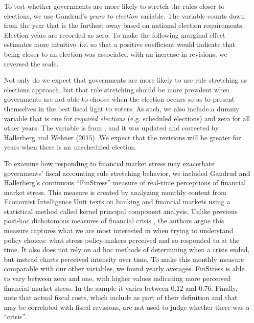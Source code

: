 \documentclass[]{article}
\begin{document}
To test whether governments are more likely to stretch the rules closer to elections, we use Gandrud's \citeyearpar{gandrudYrcurnt} \emph{years to election} variable. The variable counts down from the year that is the furthest away based on national election requirements. Election years are recorded as zero. To make the following marginal effect estimates more intuitive--i.e. so that a positive coefficient would indicate that being closer to an election was associated with an increase in revisions, we reversed the scale.

Not only do we expect that governments are more likely to use rule stretching as elections approach, but that rule stretching should be more prevalent when governments are not able to choose when the election occurs so as to present themselves in the best fiscal light to voters. As such, we also include a dummy variable that is one for \emph{required elections} (e.g. scheduled elections) and zero for all other years. The variable is from \cite{Brender2008}, and it was updated and corrected by Hallerberg and Wehner (2015). We expect that the revisions will be greater for years when there is an unscheduled election.

To examine how responding to financial market stress may exacerbate governments' fiscal accounting rule stretching behavior, we included Gandrud and Hallerberg's \citeyearpar{finstress_paper} continuous ``FinStress'' measure of real-time perceptions of financial market stress. This measure is created by analyzing monthly content from Economist Intelligence Unit texts on banking and financial markets using a statistical method called kernel principal component analysis. Unlike previous post-hoc dichotomous measures of financial crisis \citep[e.g. measures compiled by][]{Laeven2012,ReinhartRog2010}, the authors argue this measure captures what we are most interested in when trying to understand policy choices: what stress policy-makers perceived and so responded to at the time. It also does not rely on ad hoc methods of determining when a crisis ended, but instead charts perceived intensity over time. To make this monthly measure comparable with our other variables, we found yearly averages. FinStress is able to vary between zero and one, with higher values indicating more perceived financial market stress. In the sample it varies between 0.12 and 0.76. Finally, note that actual fiscal costs, which \cite{Laeven2012} include as part of their definition and that may be correlated with fiscal revisions, are not used to judge whether there was a ``crisis''.
\end{document}

